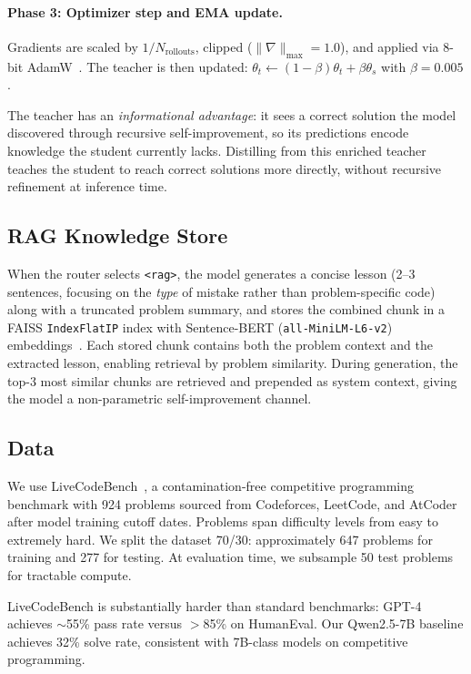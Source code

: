 \documentclass[11pt]{article}
\begin{document}
\paragraph{Phase 3: Optimizer step and EMA update.} Gradients are scaled by $1/N_{\text{rollouts}}$, clipped ($\|\nabla\|_{\max} = 1.0$), and applied via 8-bit AdamW~\citep{loshchilov2019adamw}. The teacher is then updated: $\theta_t \leftarrow (1 - \beta)\theta_t + \beta\theta_s$ with $\beta = 0.005$.

The teacher has an \emph{informational advantage}: it sees a correct solution the model discovered through recursive self-improvement, so its predictions encode knowledge the student currently lacks. Distilling from this enriched teacher teaches the student to reach correct solutions more directly, without recursive refinement at inference time.

\subsection{RAG Knowledge Store}

When the router selects \texttt{<rag>}, the model generates a concise lesson (2--3 sentences, focusing on the \emph{type} of mistake rather than problem-specific code) along with a truncated problem summary, and stores the combined chunk in a FAISS \texttt{IndexFlatIP} index with Sentence-BERT (\texttt{all-MiniLM-L6-v2}) embeddings~\citep{reimers2019sentencebert}. Each stored chunk contains both the problem context and the extracted lesson, enabling retrieval by problem similarity. During generation, the top-3 most similar chunks are retrieved and prepended as system context, giving the model a non-parametric self-improvement channel.

\subsection{Data}
\label{sec:data}

We use LiveCodeBench~\citep{jain2024livecodebench}, a contamination-free competitive programming benchmark with 924 problems sourced from Codeforces, LeetCode, and AtCoder after model training cutoff dates. Problems span difficulty levels from easy to extremely hard. We split the dataset 70/30: approximately 647 problems for training and 277 for testing. At evaluation time, we subsample 50 test problems for tractable compute.

LiveCodeBench is substantially harder than standard benchmarks: GPT-4 achieves ${\sim}$55\% pass rate versus ${>}$85\% on HumanEval. Our Qwen2.5-7B baseline achieves 32\% solve rate, consistent with 7B-class models on competitive programming.
\end{document}
